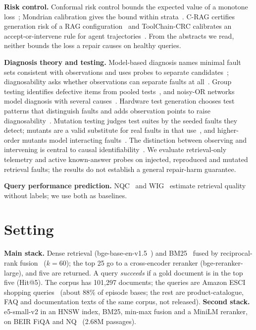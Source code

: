 \documentclass[conference]{IEEEtran}
\begin{document}
\textbf{Risk control.} Conformal risk control bounds the expected value of a monotone loss~\cite{angelopoulos2024crc}; Mondrian calibration gives the bound within strata~\cite{vovk2013mondrian}. C-RAG certifies generation risk of a RAG configuration~\cite{kang2024crag} and ToolChain-CRC calibrates an accept-or-intervene rule for agent trajectories~\cite{opoku2026toolchain}. From the abstracts we read, neither bounds the loss a repair causes on healthy queries.

\textbf{Diagnosis theory and testing.} Model-based diagnosis names minimal fault sets consistent with observations and uses probes to separate candidates~\cite{reiter1987theory,dekleer1987diagnosing}; diagnosability asks whether observations can separate faults at all~\cite{sampath1995diagnosability}. Group testing identifies defective items from pooled tests~\cite{dorfman1943,du2000group}, and noisy-OR networks model diagnosis with several causes~\cite{shwe1991qmr}. Hardware test generation chooses test patterns that distinguish faults and adds observation points to raise diagnosability~\cite{bushnell2000essentials}. Mutation testing judges test suites by the seeded faults they detect; mutants are a valid substitute for real faults in that use~\cite{just2014mutants,jia2011survey}, and higher-order mutants model interacting faults~\cite{jia2009hom}. The distinction between observing and intervening is central to causal identifiability~\cite{pearl2009causality}. We evaluate retrieval-only telemetry and active known-answer probes on injected, reproduced and mutated retrieval faults; the results do not establish a general repair-harm guarantee.

\textbf{Query performance prediction.} NQC~\cite{shtok2012qpp} and WIG~\cite{zhou2007wig} estimate retrieval quality without labels; we use both as baselines.

\section{Setting}\label{sec:setting}
\textbf{Main stack.} Dense retrieval (bge-base-en-v1.5~\cite{xiao2023bge}) and BM25~\cite{robertson2009bm25} fused by reciprocal-rank fusion~\cite{cormack2009rrf} ($k{=}60$); the top 25 go to a cross-encoder reranker (bge-reranker-large), and five are returned. A query \emph{succeeds} if a gold document is in the top five (Hit@5). The corpus has 101{,}297 documents; the queries are Amazon ESCI shopping queries~\cite{reddy2022esci} (about 88\% of episode bases; the rest are product-catalogue, FAQ and documentation texts of the same corpus, not released). \textbf{Second stack.} e5-small-v2 in an HNSW index, BM25, min-max fusion and a MiniLM reranker, on BEIR FiQA and NQ~\cite{thakur2021beir} (2.68M passages).
\end{document}
